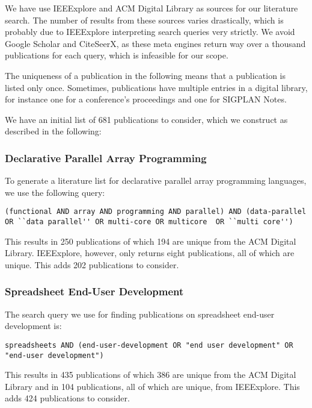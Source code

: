 \documentclass[a4paper]{article}
\begin{document}
We have use IEEExplore and ACM Digital Library as sources for our literature search. The number of results from these sources varies drastically, which is probably due to IEEExplore interpreting search queries very strictly. We avoid Google Scholar and CiteSeerX, as these meta engines return way over a thousand publications for each query,
which is infeasible for our scope.

The uniqueness of a publication in the following means that a publication is listed only once. Sometimes, publications have multiple entries in a digital library, for instance one for a conference's proceedings and one for SIGPLAN Notes.

We have an initial list of 681 publications to consider, which we construct as described in the following:

\subsubsection{Declarative Parallel Array Programming}

To generate a literature list for declarative parallel array programming languages, we use the following query:

\begin{lstlisting}
(functional AND array AND programming AND parallel) AND (data-parallel OR ``data parallel'' OR multi-core OR multicore  OR ``multi core'')
\end{lstlisting}

\noindent This results in 250 publications of which 194 are unique from the ACM Digital Library. IEEExplore, however, only returns eight publications,
all of which are unique. This adds 202 publications to consider.

\subsubsection{Spreadsheet End-User Development}

The search query we use for finding publications on spreadsheet end-user development is:

\begin{lstlisting}
spreadsheets AND (end-user-development OR "end user development" OR "end-user development")
\end{lstlisting}

\noindent This results in 435 publications of which 386 are unique from the ACM Digital Library and in 104 publications, all of which are unique, from IEEExplore. This adds 424 publications to consider.
\end{document}

